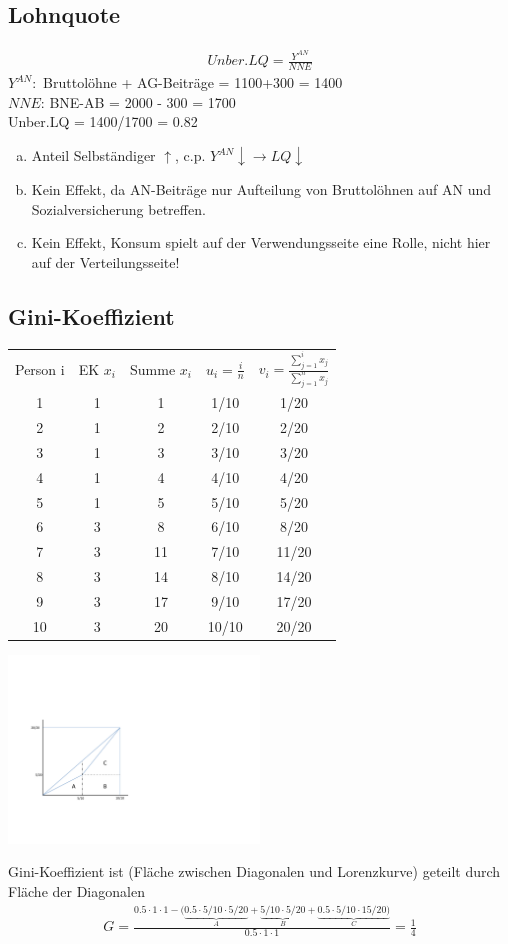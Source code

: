 \documentclass{scrartcl}
\begin{document}
\subsection{Lohnquote}
\begin{align*}
  Unber.LQ = \frac{Y^{AN}}{NNE}
\end{align*}
$Y^{AN}:$ Bruttol\"{o}hne + AG-Beitr\"{a}ge = 1100+300 = 1400\\
$NNE$: BNE-AB = 2000 - 300 = 1700 \\
Unber.LQ = 1400/1700 = 0.82
\begin{enumerate}[a)]
  \item Anteil Selbst\"{a}ndiger $\uparrow$, c.p. $Y^{AN} \downarrow \rightarrow LQ \downarrow$
  \item Kein Effekt, da AN-Beitr\"{a}ge nur Aufteilung von Bruttol\"{o}hnen auf AN und Sozialversicherung betreffen.
  \item Kein Effekt, Konsum spielt auf der Verwendungsseite eine Rolle, nicht hier auf der Verteilungsseite!
\end{enumerate}

\subsection{Gini-Koeffizient}
\begin{tabular}{ccccc}
  Person i & EK $x_i$ & Summe $x_i$ & $u_i=\frac{i}{n}$ & $v_i=\frac{\sum_{j=1}^i x_j}{\sum_{j=1}^n x_j}$ \\
  1 & 1 & 1 & 1/10 & 1/20 \\
  2 & 1 & 2 & 2/10 & 2/20 \\
  3 & 1 & 3 & 3/10 & 3/20 \\
  4 & 1 & 4 & 4/10 & 4/20 \\
  5 & 1 & 5 & 5/10 & 5/20 \\
  6 & 3 & 8 & 6/10 & 8/20 \\
  7 & 3 & 11 & 7/10 & 11/20 \\
  8 & 3 & 14 & 8/10 & 14/20 \\
  9 & 3 & 17 & 9/10 & 17/20 \\
  10 & 3 & 20 & 10/10 & 20/20
\end{tabular}
\begin{center}
  \includegraphics[width=0.5\textwidth]{Bilder/lorenz.pdf}
\end{center}
Gini-Koeffizient ist (Fl\"{a}che zwischen Diagonalen und Lorenzkurve) geteilt durch Fl\"{a}che der Diagonalen
\begin{align*}
  G = \frac{0.5\cdot 1\cdot1 - (\underbrace{0.5\cdot 5/10 \cdot 5/20}_{A} + \underbrace{5/10\cdot5/20}_B + \underbrace{0.5\cdot 5/10 \cdot 15/20)}_{C}}{0.5\cdot1\cdot 1}
  = \frac{1}{4}
\end{align*}
\end{document}

